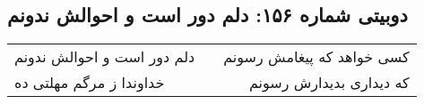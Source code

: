 \begin{center}
\section*{دوبیتی شماره ۱۵۶: دلم دور است و احوالش ندونم}
\label{sec:156}
\begin{longtable}{l p{0.5cm} r}
دلم دور است و احوالش ندونم
&&
کسی خواهد که پیغامش رسونم
\\
خداوندا ز مرگم مهلتی ده
&&
که دیداری بدیدارش رسونم
\\
\end{longtable}
\end{center}
